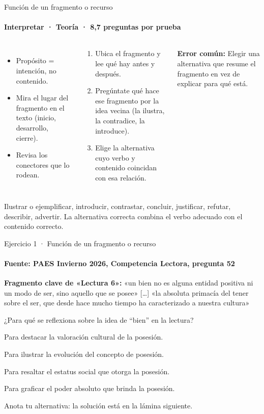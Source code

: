 \documentclass[aspectratio=169,11pt]{beamer}
\newcommand{\alternativa}[2]{\begin{opcion}\tecla{#1}\hspace{0.6em}#2\end{opcion}}
\newlength{\ajustealto}
\newenvironment{ajustar}[1][0.74\textheight]
  {\setlength{\ajustealto}{#1}\begin{lrbox}{\ajustecaja}\begin{minipage}{\textwidth}}
  {\end{minipage}\end{lrbox}%
   \ifdim\dimexpr\ht\ajustecaja+\dp\ajustecaja\relax>\ajustealto
     \resizebox*{!}{\ajustealto}{\usebox{\ajustecaja}}\else\usebox{\ajustecaja}\fi}
\begin{document}
\begin{frame}{Función de un fragmento o recurso}
\label{tema-cl-proposito}
\framesubtitle{Interpretar · Teoría · 8,7 preguntas por prueba}
\begin{ajustar}
\begin{columns}[T,onlytextwidth]
\begin{itemize}\footnotesize
\item Propósito = intención, no contenido.
\item Mira el lugar del fragmento en el texto (inicio, desarrollo, cierre).
\item Revisa los conectores que lo rodean.
\end{itemize}
\begin{cajaregla}\scriptsize \begin{enumerate}\item Ubica el fragmento y lee qué hay antes y después.\item Pregúntate qué hace ese fragmento por la idea vecina (la ilustra, la contradice, la introduce).\item Elige la alternativa cuyo verbo y contenido coincidan con esa relación.\end{enumerate}\end{cajaregla}
\begin{notagris}\scriptsize \textbf{Error común:} Elegir una alternativa que resume el fragmento en vez de explicar para qué está.\end{notagris}
\end{columns}
\begin{cajaclave}\footnotesize
Ilustrar o ejemplificar, introducir, contrastar, concluir, justificar, refutar, describir, advertir. La alternativa correcta combina el verbo adecuado con el contenido correcto.
\end{cajaclave}
\end{ajustar}
\end{frame}

\begin{frame}{Ejercicio 1 · Función de un fragmento o recurso}
\framesubtitle{Fuente: PAES Invierno 2026, Competencia Lectora, pregunta 52}
\begin{ajustar}[0.7\textheight]
\begin{notagris}\scriptsize \textbf{Fragmento clave de «Lectura 6»:} «un bien no es alguna entidad positiva ni un modo de ser, sino aquello que se posee» [\ldots] «la absoluta primacía del tener sobre el ser, que desde hace mucho tiempo ha caracterizado a nuestra cultura»\end{notagris}
{\small ¿Para qué se reflexiona sobre la idea de “bien” en la lectura?}
\vspace{0.4em}
\alternativa{A}{Para destacar la valoración cultural de la posesión.}
\alternativa{B}{Para ilustrar la evolución del concepto de posesión.}
\alternativa{C}{Para resaltar el estatus social que otorga la posesión.}
\alternativa{D}{Para graficar el poder absoluto que brinda la posesión.}
\end{ajustar}
\vfill{\tiny\color{zinc500}\hfill Anota tu alternativa: la solución está en la lámina siguiente.}
\end{frame}
\end{document}
